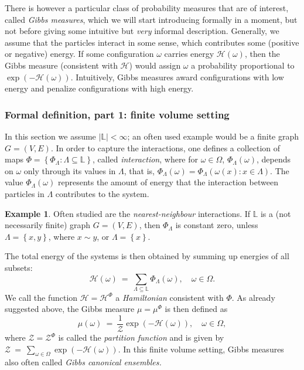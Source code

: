 \documentclass[12pt]{article}
\renewcommand{\H}{\mathcal{H}}
\renewcommand{\L}{\mathbb{L}}
\newcommand{\ZZ}{\mathcal{Z}}
\newcommand{\set}[1]{\left\{#1\right\}}
\newcommand{\1}{\mathbbm{1}}
\newcommand{\5}{\vspace{0.5cm}}
\theoremstyle{definition}
\newtheorem{ex}[thm]{Example}
\begin{document}
There is however a particular class of probability measures that are of interest, called \textit{Gibbs measures}, which we will start introducing formally in a moment, but not before giving some intuitive but \textit{very} informal description. Generally, we assume that the particles interact in some sense, which contributes some (positive or negative) energy. If some configuration $\omega$ carries energy $\H(\omega)$, then the Gibbs measure (consistent with $\H$) would assign $\omega$ a probability proportional to $\exp(-\H(\omega))$. Intuitively, Gibbs measures award configurations with low energy and penalize configurations with high energy. 


\subsubsection{Formal definition, part 1: finite volume setting}\label{FiniteVolumeSetting}

In this section we assume $|\L|<\infty$; an often used example would be a finite graph $G=(V,E)$. In order to capture the interactions, one defines a collection of maps $\Phi=\set{\Phi_\Lambda:\Lambda\subseteq\L}$, called \textit{interaction}, where for $\omega\in\Omega$, $\Phi_\Lambda(\omega)$, depends on $\omega$ only through its values in $\Lambda$, that is, $\Phi_\Lambda(\omega)=\Phi_\Lambda(\omega(x)\!:\!x\in\Lambda)$. The value $\Phi_\Lambda(\omega)$ represents the amount of energy that the interaction between particles in $\Lambda$ contributes to the system.

\begin{ex}
Often studied are the \textit{nearest-neighbour} interactions. If $\L$ is a (not necessarily finite) graph $G=(V,E)$, then $\Phi_\Lambda$ is constant zero, unless $\Lambda=\set{x,y}$, where $x\sim y$, or $\Lambda=\set{x}$.
\end{ex}

The total energy of the systems is then obtained by summing up energies of all subsets:
$$\H(\omega) ~=~ \sum_{\Lambda\subseteq \L}\Phi_\Lambda(\omega), \quad \omega\in\Omega.$$
We call the function $\H=\H^\Phi$ a \textit{Hamiltonian} consistent with $\Phi$. As already suggested above, the Gibbs measure $\mu=\mu^\Phi$ is then defined as
$$\mu(\omega) ~=~ \frac{1}{\ZZ}\exp(-\H(\omega)), \quad \omega\in\Omega,$$
where $\ZZ=\ZZ^\Phi$ is called the \textit{partition function} and is given by $\ZZ ~=~ \sum_{\omega\in\Omega}\exp(-\H(\omega)).$ In this finite volume setting, Gibbs measures also often called \textit{Gibbs canonical ensembles.} \\
\end{document}
